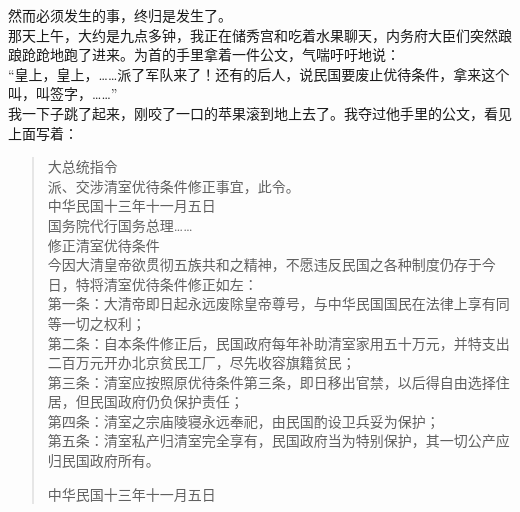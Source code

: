 然而必须发生的事，终归是发生了。\\

那天上午，大约是九点多钟，我正在储秀宫和吃着水果聊天，内务府大臣们突然踉踉跄跄地跑了进来。为首的手里拿着一件公文，气喘吁吁地说：\\

“皇上，皇上，……派了军队来了！还有的后人，说民国要废止优待条件，拿来这个叫，叫签字，……”\\

我一下子跳了起来，刚咬了一口的苹果滚到地上去了。我夺过他手里的公文，看见上面写着：\\

\begin{quote}
	大总统指令\\

派、交涉清室优待条件修正事宜，此令。\\

中华民国十三年十一月五日\\

国务院代行国务总理……\\

修正清室优待条件\\

今因大清皇帝欲贯彻五族共和之精神，不愿违反民国之各种制度仍存于今日，特将清室优待条件修正如左：\\

第一条：大清帝即日起永远废除皇帝尊号，与中华民国国民在法律上享有同等一切之权利；\\

第二条：自本条件修正后，民国政府每年补助清室家用五十万元，并特支出二百万元开办北京贫民工厂，尽先收容旗籍贫民；\\

第三条：清室应按照原优待条件第三条，即日移出官禁，以后得自由选择住居，但民国政府仍负保护责任；\\

第四条：清室之宗庙陵寝永远奉祀，由民国酌设卫兵妥为保护；\\

第五条：清室私产归清室完全享有，民国政府当为特别保护，其一切公产应归民国政府所有。\\

\begin{flushright}
	中华民国十三年十一月五日
\end{flushright}
\end{quote}

